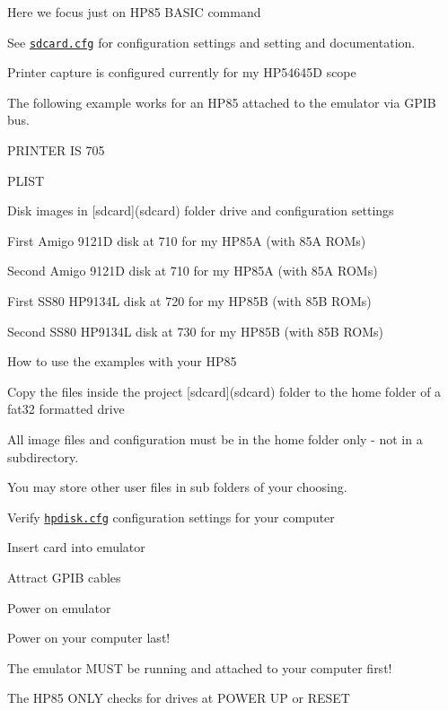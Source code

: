 \begin{DoxyItemize}
\item Here we focus just on H\+P85 B\+A\+S\+IC command
\item See \href{sdcard/sdcard.cfg}{\tt sdcard.\+cfg} for configuration settings and setting and documentation.
\begin{DoxyItemize}
\item Printer capture is configured currently for my H\+P54645D scope
\begin{DoxyItemize}
\item The following example works for an H\+P85 attached to the emulator via G\+P\+IB bus.
\begin{DoxyItemize}
\item P\+R\+I\+N\+T\+ER IS 705
\item P\+L\+I\+ST
\end{DoxyItemize}
\end{DoxyItemize}
\item Disk images in \mbox{[}sdcard\mbox{]}(sdcard) folder drive and configuration settings
\begin{DoxyItemize}
\item First Amigo 9121D disk at 710 for my H\+P85A (with 85A R\+O\+Ms)
\item Second Amigo 9121D disk at 710 for my H\+P85A (with 85A R\+O\+Ms)
\item First S\+S80 H\+P9134L disk at 720 for my H\+P85B (with 85B R\+O\+Ms)
\item Second S\+S80 H\+P9134L disk at 730 for my H\+P85B (with 85B R\+O\+Ms)
\end{DoxyItemize}
\item How to use the examples with your H\+P85
\begin{DoxyItemize}
\item Copy the files inside the project \mbox{[}sdcard\mbox{]}(sdcard) folder to the home folder of a fat32 formatted drive
\begin{DoxyItemize}
\item All image files and configuration must be in the home folder only -\/ not in a subdirectory.
\item You may store other user files in sub folders of your choosing.
\end{DoxyItemize}
\item Verify \href{sdcard/hpdisk.cfg}{\tt hpdisk.\+cfg} configuration settings for your computer
\item Insert card into emulator
\item Attract G\+P\+IB cables
\item Power on emulator
\item Power on your computer last!
\begin{DoxyItemize}
\item The emulator M\+U\+ST be running and attached to your computer first!
\item The H\+P85 O\+N\+LY checks for drives at P\+O\+W\+ER UP or R\+E\+S\+ET
\end{DoxyItemize}
\end{DoxyItemize}
\end{DoxyItemize}
\end{DoxyItemize}

